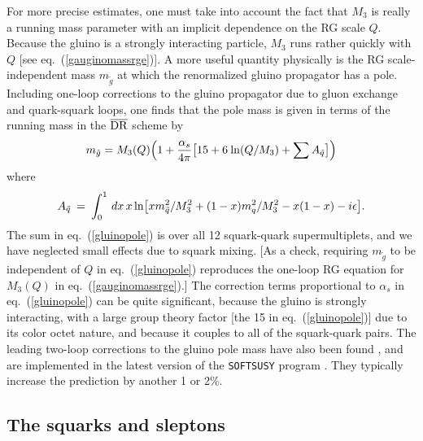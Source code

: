 \documentclass[12pt]{article}
\def\beq{\begin{eqnarray}}
\def\eeq{\end{eqnarray}}
\def\drbar{\overline{\rm DR}}
\begin{document}
For more precise estimates, one must take into account the fact that $M_3$ 
is really a running mass parameter with an implicit dependence on the RG 
scale $Q$. Because the gluino is a strongly interacting particle, $M_3$ 
runs rather quickly with $Q$ [see eq.~(\ref{gauginomassrge})]. A more 
useful quantity physically is the RG scale-independent mass $m_{\tilde g}$ 
at which the renormalized gluino propagator has a pole. Including one-loop 
corrections to the gluino propagator due to gluon exchange and 
quark-squark loops, one finds that the pole mass is given in terms of the 
running mass in the $\drbar$ scheme by \cite{gluinopolemass}
\beq
m_{\tilde g} = M_3(Q) \Bigl ( 1 + {\alpha_s\over 4 \pi}
\bigl [ 15 + 6\> {\rm ln}(Q/ M_3) + \sum A_{\tilde q}\bigr ] \Bigr )
\label{gluinopole}
\eeq
where
\beq
A_{\tilde q} \>=\> \int_0^1 \, dx \, x \, {\rm ln}
\bigl [
x m_{\tilde q}^2/M_3^2 + (1-x) m_{q}^2/M_3^2 - x(1-x) - i \epsilon
\bigr ].
\eeq
The sum in eq.~(\ref{gluinopole}) is over all 12 squark-quark 
supermultiplets, and we have neglected small effects due to squark mixing. 
[As a check, requiring $m_{\tilde g}$ to be independent of $Q$ in 
eq.~(\ref{gluinopole}) reproduces the one-loop RG equation for $M_3(Q)$ in 
eq.~(\ref{gauginomassrge}).] The correction terms proportional to 
$\alpha_s$ in eq.~(\ref{gluinopole}) can be quite significant,
because the gluino is strongly interacting, with a large group 
theory factor [the 15 in eq.~(\ref{gluinopole})] due to its color octet 
nature, and because it couples to all of the squark-quark pairs. The leading 
two-loop corrections to the gluino pole mass have also been found 
\cite{gluinopoletwo,GNCpoletwo,Martin:2006ub}, and are implemented in the latest
version of the {\tt SOFTSUSY} program \cite{SOFTSUSY}. 
They typically increase the prediction by another 1 or 2\%.

\subsection{The squarks and sleptons\label{subsec:MSSMspectrum.sfermions}}
\setcounter{equation}{0}
\setcounter{footnote}{1}
\end{document}

